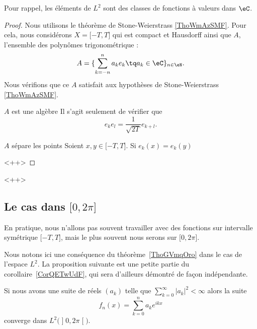 Pour rappel, les éléments de \( L^2\) sont des classes de fonctions à valeurs dans \( \eC\).

\begin{proof}
    Nous utilisons le théorème de Stone-Weierstrass \ref{ThoWmAzSMF}. Pour cela, nous considérons \( X=\mathopen[ -T , T \mathclose]\) qui est compact et Hausdorff ainsi que \( A\), l'ensemble des polynômes trigonométrique :
    \begin{equation}
        A=\{ \sum_{k=-n}^na_ke_k\tq a_k\in \eC \}_{n\in \eN}.
    \end{equation}
    Nous vérifions que ce \( A\) satisfait aux hypothèses de Stone-Weierstrass \ref{ThoWmAzSMF}.
    \begin{subproof}
        \item[\( A\) est une algèbre]
            Il s'agit seulement de vérifier que
            \begin{equation}
                e_ke_l=\frac{1}{ \sqrt{ 2T } }e_{k+l}.
            \end{equation}
        \item[\( A\) sépare les points]
            Soient \( x,y\in \mathopen[ -T , T \mathclose]\). Si \( e_k(x)=e_k(y)\)
    \end{subproof}
    <++>
\end{proof}
<++>

\subsection{Le cas dans \( \mathopen[ 0 , 2\pi \mathclose]\)}

En pratique, nous n'allons pas souvent travailler avec des fonctions sur intervalle symétrique \( \mathopen[ -T , T \mathclose]\), mais le plus souvent nous serons sur \( \mathopen[ 0 , 2\pi \mathclose]\).

Nous notons ici une conséquence du théorème~\ref{ThoGVmqOro} dans le cas de l'espace \( L^2\). La proposition suivante est une petite partie du corollaire~\ref{CorQETwUdF}, qui sera d'ailleurs démontré de façon indépendante.

\begin{proposition}
    Si nous avons une suite de réels \( (a_k)\) telle que \( \sum_{k=0}^{\infty}| a_k |^2<\infty\) alors la suite
    \begin{equation}
        f_n(x)=\sum_{k=0}^na_k e^{ikx}
    \end{equation}
    converge dans \( L^2\big( \mathopen] 0 , 2\pi \mathclose[ \big)\).
\end{proposition}

